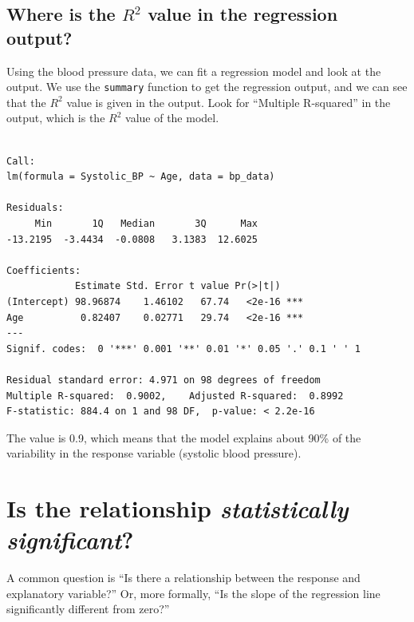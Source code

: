 \documentclass[
  letterpaper,
  8pt,
  a4paper]{book}
\begin{document}
\subsection*{\texorpdfstring{Where is the \(R^2\) value in the
regression
output?}{Where is the R\^{}2 value in the regression output?}}\label{where-is-the-r2-value-in-the-regression-output}

Using the blood pressure data, we can fit a regression model and look at
the output. We use the \texttt{summary} function to get the regression
output, and we can see that the \(R^2\) value is given in the output.
Look for ``Multiple R-squared'' in the output, which is the \(R^2\)
value of the model.

\begin{verbatim}

Call:
lm(formula = Systolic_BP ~ Age, data = bp_data)

Residuals:
     Min       1Q   Median       3Q      Max 
-13.2195  -3.4434  -0.0808   3.1383  12.6025 

Coefficients:
            Estimate Std. Error t value Pr(>|t|)    
(Intercept) 98.96874    1.46102   67.74   <2e-16 ***
Age          0.82407    0.02771   29.74   <2e-16 ***
---
Signif. codes:  0 '***' 0.001 '**' 0.01 '*' 0.05 '.' 0.1 ' ' 1

Residual standard error: 4.971 on 98 degrees of freedom
Multiple R-squared:  0.9002,    Adjusted R-squared:  0.8992 
F-statistic: 884.4 on 1 and 98 DF,  p-value: < 2.2e-16
\end{verbatim}

The value is 0.9, which means that the model explains about 90\% of the
variability in the response variable (systolic blood pressure).

\section*{\texorpdfstring{Is the relationship \emph{statistically
significant}?}{Is the relationship statistically significant?}}\label{is-the-relationship-statistically-significant}


A common question is ``Is there a relationship between the response and
explanatory variable?'' Or, more formally, ``Is the slope of the
regression line significantly different from zero?''
\end{document}
